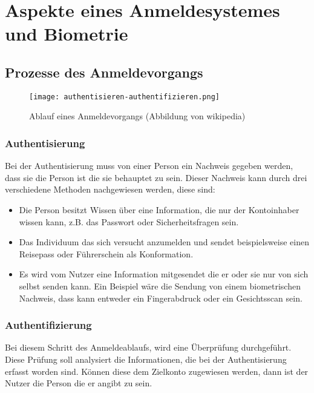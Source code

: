 \chapter{Aspekte eines Anmeldesystemes und Biometrie}
\strahlhofer

\section{Prozesse des Anmeldevorgangs}
\begin{center}
\begin{figure}[h]
    \centering
    \texttt{[image: authentisieren-authentifizieren.png]}
    \caption{Ablauf eines Anmeldevorgangs (Abbildung von wikipedia)}
\end{figure}
\end{center}

\subsection{Authentisierung}
Bei der Authentisierung muss von einer Person ein Nachweis gegeben werden, dass sie die Person ist die sie behauptet zu sein. Dieser Nachweis kann durch drei verschiedene Methoden nachgewiesen werden, diese sind:
\begin{itemize}
	\item Die Person besitzt Wissen über eine Information, die nur der Kontoinhaber wissen kann, z.B. das Passwort oder Sicherheitsfragen sein.
	\item Das Individuum das sich versucht anzumelden und sendet beispielsweise einen Reisepass oder Führerschein als Konformation.
	\item Es wird vom Nutzer eine Information mitgesendet die er oder sie nur von sich selbst senden kann. Ein Beispiel wäre die Sendung von einem biometrischen Nachweis, dass kann entweder ein Fingerabdruck oder ein Gesichtsscan sein.
\end{itemize}

\subsection{Authentifizierung}
Bei diesem Schritt des Anmeldeablaufs, wird eine Überprüfung durchgeführt. Diese Prüfung soll analysiert die Informationen, die bei der Authentisierung erfasst worden sind. Können diese dem Zielkonto zugewiesen werden, dann ist der Nutzer die Person die er angibt zu sein.

